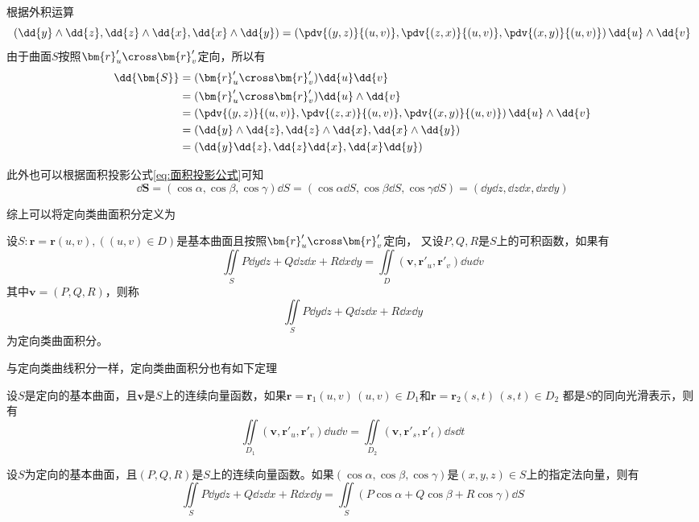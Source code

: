 根据外积运算
\[ (\dd{y}\wedge\dd{z}, \dd{z}\wedge\dd{x}, \dd{x}\wedge\dd{y}) = \left(\pdv{(y,z)}{(u,v)},\pdv{(z,x)}{(u,v)},\pdv{(x,y)}{(u,v)}\right)\dd{u}\wedge\dd{v} \]
由于曲面$S$按照$\bm{r}'_u\cross\bm{r}'_v$定向，所以有
\begin{align*}
    \dd{\bm{S}}
     & = (\bm{r}'_u\cross\bm{r}'_v)\dd{u}\dd{v}                                                  \\
     & = (\bm{r}'_u\cross\bm{r}'_v)\dd{u}\wedge\dd{v}                                            \\
     & = \left(\pdv{(y,z)}{(u,v)},\pdv{(z,x)}{(u,v)},\pdv{(x,y)}{(u,v)}\right)\dd{u}\wedge\dd{v} \\
     & = (\dd{y}\wedge\dd{z}, \dd{z}\wedge\dd{x}, \dd{x}\wedge\dd{y})                            \\
     & = (\dd{y}\dd{z},\dd{z}\dd{x},\dd{x}\dd{y})
\end{align*}

此外也可以根据面积投影公式\ref{eq:面积投影公式}可知
\[ \dd{\bm{S}} = (\cos\alpha,\cos\beta,\cos\gamma)\dd{S} = (\cos\alpha\dd{S},\cos\beta\dd{S},\cos\gamma\dd{S}) = (\dd{y}\dd{z},\dd{z}\dd{x},\dd{x}\dd{y}) \]

综上可以将定向类曲面积分定义为
\begin{definition}
    设$S:\bm{r}=\bm{r}(u,v),((u,v)\in D)$是基本曲面且按照$\bm{r}'_u\cross\bm{r}'_v$定向，
    又设$P,Q,R$是$S$上的可积函数，如果有
    \[ \iint\limits_S P\dd{y}\dd{z} + Q\dd{z}\dd{x} + R\dd{x}\dd{y} = \iint\limits_D (\bm{v},\bm{r}'_u,\bm{r}'_v)\dd{u}\dd{v} \]
    其中$\bm{v}=(P,Q,R)$，则称
    \[ \iint\limits_S P\dd{y}\dd{z} + Q\dd{z}\dd{x} + R\dd{x}\dd{y} \]
    为定向类曲面积分。
\end{definition}

与定向类曲线积分一样，定向类曲面积分也有如下定理
\begin{theorem}
    设$S$是定向的基本曲面，且$\bm{v}$是$S$上的连续向量函数，如果$\bm{r}=\bm{r}_1(u,v)\,(u,v)\in D_1$和$\bm{r}=\bm{r}_2(s,t)\,(s,t)\in D_2$
    都是$S$的同向光滑表示，则有
    \[ \iint\limits_{D_1} (\bm{v},\bm{r}'_u, \bm{r}'_v)\dd{u}\dd{v} = \iint\limits_{D_2} (\bm{v},\bm{r}'_s,\bm{r}'_t)\dd{s}\dd{t} \]
\end{theorem}

\begin{theorem}
    设$S$为定向的基本曲面，且$(P,Q,R)$是$S$上的连续向量函数。如果$(\cos\alpha,\cos\beta,\cos\gamma)$是$(x,y,z)\in S$上的指定法向量，则有
    \[ \iint\limits_S P\dd{y}\dd{z} + Q\dd{z}\dd{x} + R\dd{x}\dd{y} = \iint\limits_S (P\cos\alpha + Q\cos\beta + R\cos\gamma) \dd{S} \]
\end{theorem}


